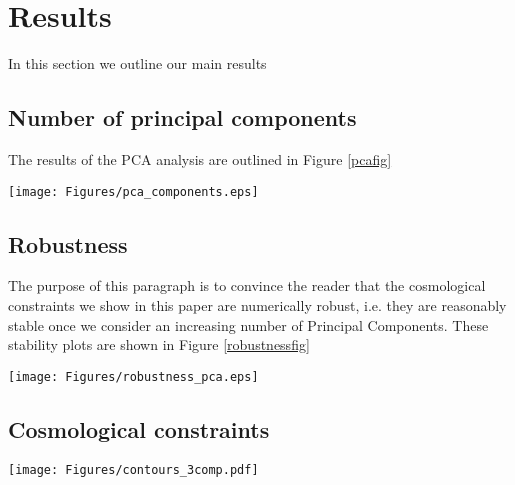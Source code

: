 \documentclass[reprint,aps,prd,superscriptaddress,showkeys,showpacs]{revtex4-1}
\begin{document}

\section{Results}
In this section we outline our main results

\subsection{Number of principal components}
%
The results of the PCA analysis are outlined in Figure \ref{pcafig}
\begin{figure*}
\texttt{[image: Figures/pca\_components.eps]}
\caption{Principal Components of the $V_0$ (red), $V_1$ (blue), $V_2$ (green), LM (black) and Power Spectrum (orange) feature spaces; the left plot shows the magnitudes of the PCA eigenvalues $\Sigma_i^2$, the right plot shows their cumulative sum. A dashed black line has been drawn in correspondence of $n=3$ components}
\label{pcafig}
\end{figure*}

\subsection{Robustness}
%
The purpose of this paragraph is to convince the reader that the cosmological constraints we show in this paper are numerically robust, i.e. they are reasonably stable once we consider an increasing number of Principal Components. These stability plots are shown in Figure \ref{robustnessfig}

\begin{figure*}
\texttt{[image: Figures/robustness\_pca.eps]}
\caption{Stability plot}
\label{robustnessfig}
\end{figure*}

\subsection{Cosmological constraints}

\begin{figure*}
\begin{center}
\texttt{[image: Figures/contours\_3comp.pdf]}
\end{center}
\caption{$1\sigma$ constraints on the $(\Omega_m,\sigma_8)$ parameter doublet using the $V_0$ (red), $V_1$ (blue), $V_2$ (green), LM (black) and Power Spectrum (orange) statistics; the two panels are obtained marginalizing the parameter likelihood (\ref{parameterlikelihood}) over $w$ (left panel) and conditioning it on the plane where $w$ corresponds to its best fit value (right panel)}
\label{contours3comp}
\end{figure*}
\end{document}
